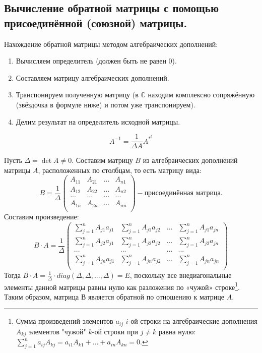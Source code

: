 \documentclass[a4paper,14pt]{article}
\begin{document}
\subsection{Вычисление обратной матрицы с помощью присоединённой (союзной) матрицы.}
Нахождение обратной матрицы методом алгебраических дополнений:
\begin{enumerate}
	\item Вычисляем определитель (должен быть не равен 0).
	\item Составляем матрицу алгебраических дополнений. 
	\item Транспонируем полученную матрицу (в $\mathbb{C}$ находим комплексно сопряжённую (звёздочка в формуле ниже) и потом уже транспонируем).
	\item Делим результат на определитель исходной матрицы.
\end{enumerate}
\[A^{-1}=\frac{1}{\Delta A} A^{*^t}\]
\begin{evidence}
	Пусть $\Delta = \det A \ne 0$. Составим матрицу $B$ из алгебраических дополнений матрицы $A$, расположенных по столбцам, то есть матрицу вида:
	\[
	B=\frac{1}{\Delta}
	\begin{pmatrix}
	A_{11} & A_{21} & ... & A_{n1} \\
	A_{12} & A_{22} & ... & A_{n2} \\
	... & ... & ... & ... \\
	A_{1n} & A_{2n} & ... & A_{nn} \\
	\end{pmatrix} - \text{присоединённая матрица.}
	\]
	Составим произведение:
	\[
	B \cdot A = \frac{1}{\Delta}
	\begin{pmatrix}
	\sum\limits_{j=1}^nA_{j1}a_{j1} & \sum\limits_{j=1}^nA_{j1}a_{j2} & ... & \sum\limits_{j=1}^nA_{j1}a_{jn} \\
	\sum\limits_{j=1}^nA_{j2}a_{j1} & \sum\limits_{j=1}^nA_{j2}a_{j2} & ... & \sum\limits_{j=1}^nA_{j2}a_{jn} \\
	... & ... & ... & ... \\
	\sum\limits_{j=1}^nA_{jn}a_{j1} & \sum\limits_{j=1}^nA_{jn}a_{j2} & ... & \sum\limits_{j=1}^nA_{jn}a_{jn} \\
	\end{pmatrix}
	\]
	Тогда $B \cdot A = \frac{1}{\Delta} \cdot diag(\Delta, \Delta, ..., \Delta) = E$, поскольку все внедиагональные элементы данной матрицы равны нулю как разложения по «чужой» строке\footnote{Сумма произведений элементов $a_{ij}$ $i$-ой строки на алгебраические дополнения $A_{kj}$ элементов "чужой" $k$-ой строки при $j \ne k$ равна нулю: $\sum\limits_{j=1}^na_{ij}A_{kj}=a_{i1}A_{k1}+...+a_{in}A_{kn}=0$.}. Таким образом, матрица В является обратной по отношению к матрице $A$.
\end{evidence}
\end{document}
